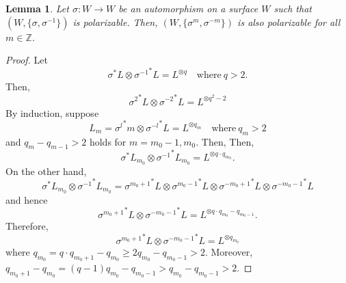 \documentclass[11pt,letterpaper]{amsart}
\newtheorem{lem}[thm]{Lemma}
\begin{document}
    \begin{lem}\label{induction}
         Let $\sigma :W \rightarrow W$ be an automorphism on a surface $W$ such that $(W, \{ \sigma, \sigma^{-1}\})$ is polarizable. Then, $(W, \{ \sigma^m, \sigma^{-m}\})$ is also polarizable for all $m \in \mathbb{Z}$.
    \end{lem}
    \begin{proof}
            Let
        \[
        \sigma^*L \otimes {\sigma^{-1}}^*L = L^{\otimes q}\quad \text{where}~ q>2.
        \]
        Then,
        \[
        {\sigma^2}^*L \otimes {\sigma^{-2}}^*L = L^{\otimes q^2-2}
        \]
        By induction, suppose
        \[
        L_m = {\sigma^l}^*m \otimes {\sigma^{-l}}^*L = L^{\otimes q_m}\quad \text{where}~ q_m>2
        \]
        and $q_{m} - q_{m-1}>2$ holds for $m=m_0-1, m_0$.  Then,
        Then,
        \[
        {\sigma}^*L_{m_0} \otimes {\sigma^{-1}}^*L_{m_0}
        = L^{\otimes q \cdot q_{m_0}}.
        \]
        On the other hand,
        \[
        {\sigma}^*L_{m_0} \otimes {\sigma^{-1}}^*L_{m_0}
        = {\sigma^{{m_0}+1}}^*L \otimes {\sigma^{{m_0}-1}}^*L  \otimes {\sigma^{-{m_0}+1}}^*L \otimes {\sigma^{-{m_0}-1}}^*L
        \]
        and hence
        \[
        {\sigma^{{m_0}+1}}^*L \otimes  {\sigma^{-{m_0}-1}}^*L = L^{\otimes q\cdot q_{m_0} - q_{{m_0}-1}}.
        \]
        Therefore,
        \[
        {\sigma^{{m_0}+1}}^*L \otimes  {\sigma^{-{m_0}-1}}^*L = L^{\otimes q_{m_0}}
        \]
        where $q_{m_0} = q\cdot q_{{m_0}+1} - q_{{m_0}} \geq 2q_{{m_0}} - q_{{m_0}-1}>2$. Moreover, $q_{{m_0}+1} - q_{{m_0}} = (q-1)q_{{m_0}} - q_{{m_0}-1} > q_{m_0} - q_{{m_0}-1} >2$.
    \end{proof}
\end{document}
